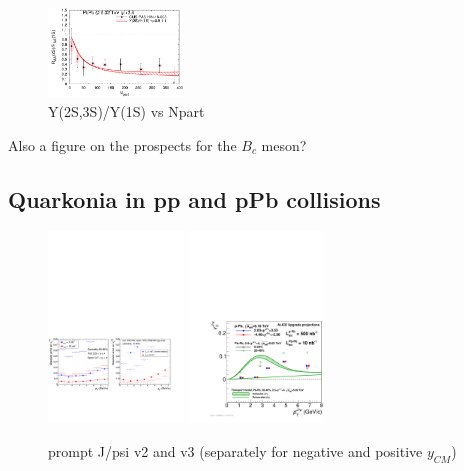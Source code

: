 \documentclass[../report.tex]{subfiles}
\begin{document}
\begin{figure}
 \begin{center}
  \includegraphics[width=0.32\textwidth]{fig/theory/rapp_dr_npart.png}
 \end{center}

 \caption{Y(2S,3S)/Y(1S) vs Npart~\cite{Du:2017qkv}}
\end{figure}


Also a figure on the prospects for the $B_c$ meson?

\subsection{Quarkonia in pp and pPb collisions}

\begin{figure}
 \begin{center}
  \includegraphics[width=0.32\textwidth]{fig/alice/alice_jpsi_v2_projected.pdf}
  \includegraphics[width=0.32\textwidth]{fig/alice/alice_jpsi_v2_projected2.pdf}
 \end{center}

 \caption{prompt J/psi v2 and v3 (separately for negative and positive $y_{CM}$)}
\end{figure}
\end{document}
